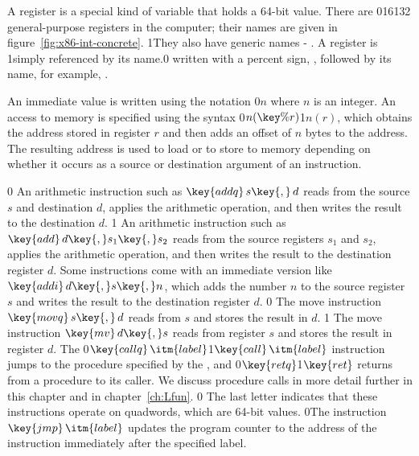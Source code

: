 \documentclass[7x10]{TimesAPriori_MIT}%
\def\racketEd{0}
\def\edition{1}
\def\xeightysixEd{0}
\def\riscvEd{1}
\def\architecture{1}
\newcommand\ifriscv[1]{\if\architecture\riscvEd{#1}\fi}
\newcommand\ifxeightsix[1]{\if\architecture\xeightysixEd{#1}\fi}
\newcommand{\racket}[1]{{\if\edition\racketEd{#1}\fi}}
\numberwithin{theorem}{chapter}
\numberwithin{definition}{chapter}
\numberwithin{equation}{chapter}
\begin{document}
A register is a special kind of variable that holds a 64-bit
value. There are \ifxeightsix{16}\ifriscv{32} general-purpose registers in the computer; their
names are given in figure~\ref{fig:x86-int-concrete}. \ifriscv{They
  also have generic names  - .}  A register is
\ifriscv{simply referenced by its name.}\ifxeightsix{
written with a percent sign, \key{\%}, followed by its name,
for example, \key{\%rax}.}

An immediate value is written using the notation \ifxeightsix{\key{\$}}$n$ where $n$
is an integer.
%
%
An access to memory is specified using the syntax \ifxeightsix{$n(\key{\%}r)$}\ifriscv{$n(r)$},
which obtains the address stored in register $r$ and then adds an
offset of $n$ bytes
to the address. The resulting address is used to load or to store
to memory depending on whether it occurs as a source or destination
argument of an instruction.

\if\architecture\xeightysixEd
  An arithmetic instruction such as $\key{addq}\,s\key{,}\,d$ reads
  from the source $s$ and destination $d$, applies the arithmetic
  operation, and then writes the result to the destination
  $d$.
\fi
\if\architecture\riscvEd
  An arithmetic instruction such as $\key{add}\,d\key{,}s_1\key{,}s_2$ reads from
  the source registers $s_1$ and $s_2$, applies the arithmetic
  operation, and then writes the result to the destination register
  $d$.
  Some instructions come with an immediate version like
  $\key{addi}\,d\key{,}s\key{,}n$, which adds the number $n$ to the source
  register $s$ and writes the result to the destination register $d$.
\fi
%
\if\architecture\xeightysixEd
  The move instruction $\key{movq}\,s\key{,}\,d$ reads from $s$ and
  stores the result in $d$.
\fi
\if\architecture\riscvEd
  The move instruction $\key{mv}\,d\key{,}s$ reads from register $s$ and
  stores the result in register $d$.
\fi
%
The \ifxeightsix{$\key{callq}\,\itm{label}$}\ifriscv{$\key{call}\,\itm{label}$} instruction jumps to the procedure
specified by the , and \ifxeightsix{$\key{retq}$}\ifriscv{$\key{ret}$} returns from a procedure to
its caller.
%
We discuss procedure calls in more detail further in this chapter and
in chapter~\ref{ch:Lfun}.
%
\if\architecture\xeightysixEd
The last letter  indicates that these instructions operate on
quadwords, which are 64-bit values.
\fi
%
\racket{The instruction $\key{jmp}\,\itm{label}$ updates the program
  counter to the address of the instruction immediately after the
  specified label.}
\end{document}
